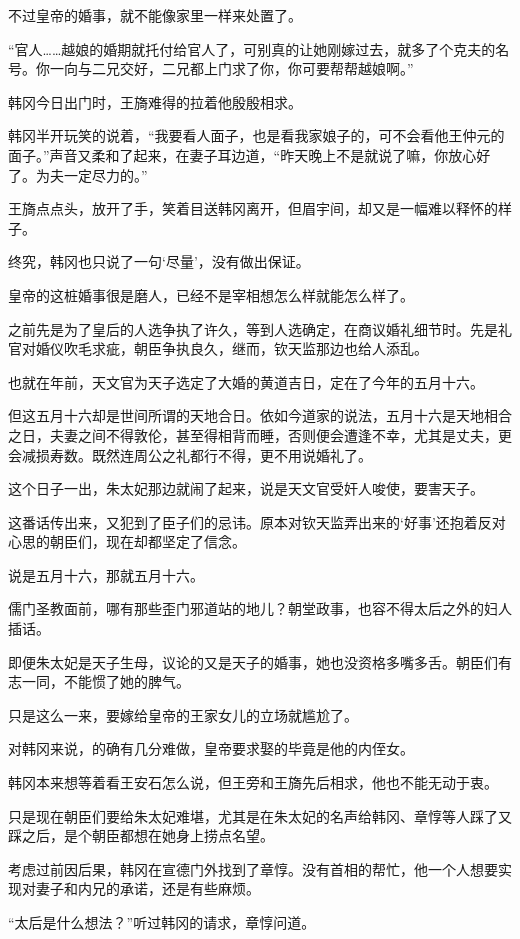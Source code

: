 不过皇帝的婚事，就不能像家里一样来处置了。

“官人……越娘的婚期就托付给官人了，可别真的让她刚嫁过去，就多了个克夫的名号。你一向与二兄交好，二兄都上门求了你，你可要帮帮越娘啊。”

韩冈今日出门时，王旖难得的拉着他殷殷相求。

韩冈半开玩笑的说着，“我要看人面子，也是看我家娘子的，可不会看他王仲元的面子。”声音又柔和了起来，在妻子耳边道，“昨天晚上不是就说了嘛，你放心好了。为夫一定尽力的。”

王旖点点头，放开了手，笑着目送韩冈离开，但眉宇间，却又是一幅难以释怀的样子。

终究，韩冈也只说了一句‘尽量’，没有做出保证。

皇帝的这桩婚事很是磨人，已经不是宰相想怎么样就能怎么样了。

之前先是为了皇后的人选争执了许久，等到人选确定，在商议婚礼细节时。先是礼官对婚仪吹毛求疵，朝臣争执良久，继而，钦天监那边也给人添乱。

也就在年前，天文官为天子选定了大婚的黄道吉日，定在了今年的五月十六。

但这五月十六却是世间所谓的天地合日。依如今道家的说法，五月十六是天地相合之日，夫妻之间不得敦伦，甚至得相背而睡，否则便会遭逢不幸，尤其是丈夫，更会减损寿数。既然连周公之礼都行不得，更不用说婚礼了。

这个日子一出，朱太妃那边就闹了起来，说是天文官受奸人唆使，要害天子。

这番话传出来，又犯到了臣子们的忌讳。原本对钦天监弄出来的‘好事’还抱着反对心思的朝臣们，现在却都坚定了信念。

说是五月十六，那就五月十六。

儒门圣教面前，哪有那些歪门邪道站的地儿？朝堂政事，也容不得太后之外的妇人插话。

即便朱太妃是天子生母，议论的又是天子的婚事，她也没资格多嘴多舌。朝臣们有志一同，不能惯了她的脾气。

只是这么一来，要嫁给皇帝的王家女儿的立场就尴尬了。

对韩冈来说，的确有几分难做，皇帝要求娶的毕竟是他的内侄女。

韩冈本来想等着看王安石怎么说，但王旁和王旖先后相求，他也不能无动于衷。

只是现在朝臣们要给朱太妃难堪，尤其是在朱太妃的名声给韩冈、章惇等人踩了又踩之后，是个朝臣都想在她身上捞点名望。

考虑过前因后果，韩冈在宣德门外找到了章惇。没有首相的帮忙，他一个人想要实现对妻子和内兄的承诺，还是有些麻烦。

“太后是什么想法？”听过韩冈的请求，章惇问道。

